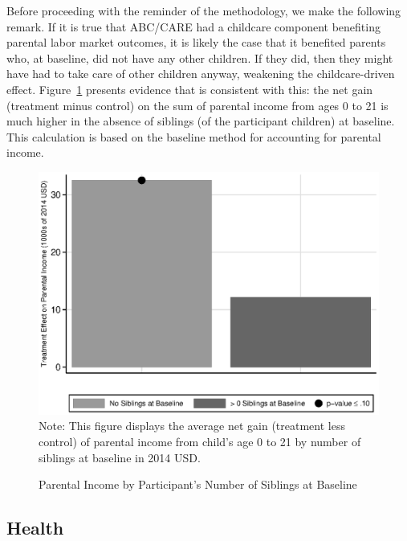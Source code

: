 Before proceeding with the reminder of the methodology, we make the following remark. If it is true that ABC/CARE had a childcare component benefiting parental labor market outcomes, it is likely the case that it benefited parents who, at baseline, did not have any other children. If they did, then they might have had to take care of other children anyway, weakening the childcare-driven effect. Figure~\ref{figure:pincome} presents evidence that is consistent with this: the net gain (treatment minus control) on the sum of parental income from ages 0 to 21 is much higher in the absence of siblings (of the participant children) at baseline. This calculation is based on the baseline method for accounting for parental income.

\begin{figure}[!htbp]
\centering
\caption{Parental Income by Participant's Number of Siblings at Baseline}\label{figure:pincome}
\includegraphics[width=.5\columnwidth]{output/abccare_pincomesum_spooled.eps}
\footnotesize \justify
Note: This figure displays the average net gain (treatment less control) of parental income from child's age 0 to 21 by number of siblings at baseline in 2014 USD.
\end{figure}

\subsection{Health} \label{section:health}

